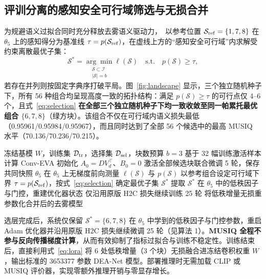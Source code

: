 \documentclass[10pt,twocolumn,letterpaper]{article}
\begin{document}
\subsection{评训分离的感知安全可行域筛选与无损合并}
为规避语义过拟合同时充分释放去雾语义驱动力，\method~以参考位置 $\mathcal S_{\rm ref}=\{1,7,8\}$ 在 $\theta_5$ 上的感知得分为基准线 $\tau=p(\mathcal S_{\rm ref})$，在虚线上方的“感知安全可行域”内求解受约束离散最优子集：
\begin{equation}
\mathcal S^*=\underset{\substack{\mathcal S\subset\mathcal I\\|\mathcal S|=b}}{\arg\min}\ell(\mathcal S)
\quad\text{s.t.}\quad p(\mathcal S)\ge\tau,
\label{eq:selection}
\end{equation}
若存在并列则按固定字典序打破平局。图~\ref{fig:landscape} 显示，三个独立随机种子下，所有 56 种组合均呈现高度一致的拓扑结构：满足 $p(\mathcal S)\ge\tau$ 的可行点仅 4--6 个，且式~\eqref{eq:selection} \textbf{在全部三个独立随机种子下均一致收敛至同一帕累托最优组合 $\{6,7,8\}$}（绿方块）。该组合不仅在可行域内语义损失最低（0.95961/0.95984/0.95967），而且同时达到了全部 56 个候选中的最高 MUSIQ 水平（70.136/70.236/70.215）。

\begin{algorithm}[t]
\caption{\method：感知可行域引导的低秩层分配}
\begin{algorithmic}[1]
\Require 冻结基模 $W$，训练集 $\mathcal D_{\rm tr}$，选择集 $\mathcal D_{\rm sel}$，块数预算 $b=3$
\State 基于 32 幅训练激活样本计算 Conv-EVA 初始化 $A_0=DV_d^\top$、$B_0=0$
\State 激活全部候选块联合微调 5 轮，保存共同快照 $\theta_5$
\State 在 $\theta_5$ 上无梯度前向测量 $\ell(\mathcal S)$ 与 $p(\mathcal S)$
\EndFor
\State 以参考组合设定可行域下界 $\tau=p(\mathcal S_{\rm ref})$，按式~\eqref{eq:selection} 确定最优子集 $\mathcal S^*$
\State 提取 $\mathcal S^*$ 在 $\theta_5$ 中的低秩因子与门控，重建优化器状态
\State 仅沿用原版 H2C 损失继续训练 25 轮
\State \Return 将低秩增量无损重参数化合并后的去雾模型
\end{algorithmic}
\end{algorithm}

选层完成后，系统仅保留 $\mathcal S^*=\{6,7,8\}$ 在 $\theta_5$ 中学到的低秩因子与门控参数，重启 Adam 优化器并沿用原版 H2C 损失继续微调 25 轮（见算法 1）。\textbf{MUSIQ 全程不参与反向传播梯度计算}，从而有效抑制了指标过拟合与训练不稳定性。训练结束后，直接利用式~\eqref{eq:lora} 将 6 处低秩增量（3 个块）无损融合进冻结卷积权重 $W$，输出标准的 3653377 参数 DEA-Net 模型。部署推理时无需加载 CLIP 或 MUSIQ 评价器，实现零额外推理开销与零显存增长。
\end{document}
